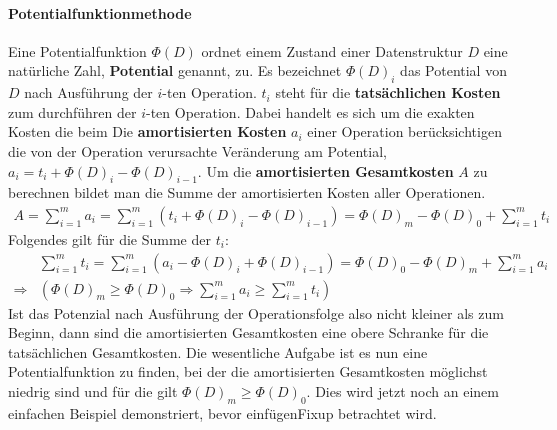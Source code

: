 \documentclass[a4paper,12pt]{article}
\begin{document}
\paragraph{Potentialfunktionmethode} Eine Potentialfunktion $\Phi(D)$ ordnet einem Zustand einer Datenstruktur $D$ eine natürliche Zahl, \textbf{Potential} genannt, zu. Es bezeichnet $\Phi(D)_{i}$ das Potential von $D$ nach Ausführung der $i$-ten Operation. $t_i$ steht für die \textbf{tatsächlichen Kosten} zum durchführen der $i$-ten Operation. Dabei handelt es sich um die exakten Kosten die beim Die \textbf{amortisierten Kosten} $a_i$ einer Operation berücksichtigen die von der Operation verursachte Veränderung am Potential, $a_i = t_i + \Phi(D)_{i} - \Phi(D)_{i-1}$. Um die \textbf{amortisierten Gesamtkosten} $A$ zu berechnen bildet man die Summe der amortisierten Kosten aller Operationen. 
\begin{align*}
A = \sum_{i = 1}^{m} a_i =  \sum_{i = 1}^{m} \left(t_i + \Phi\left(D\right)_{i} - \Phi\left(D\right)_{i-1}\right) = \Phi\left(D\right)_{m} - \Phi\left(D\right)_{0} + \sum_{i = 1}^{m} t_i 
\end{align*}
Folgendes gilt für die Summe der $t_i$:
\begin{align*}
&\sum_{i = 1}^{m} t_i =  \sum_{i = 1}^{m} \left(a_i - \Phi\left(D\right)_{i} + \Phi\left(D\right)_{i-1}\right) = \Phi\left(D\right)_{0} - \Phi\left(D\right)_{m} + \sum_{i = 1}^{m} a_i \\
\Rightarrow &\left( \Phi\left(D\right)_{m} \geq \Phi\left(D\right)_{0} \Rightarrow \sum_{i = 1}^{m} a_i \geq \sum_{i = 1}^{m} t_i \right)
\end{align*}
Ist das Potenzial nach Ausführung der Operationsfolge also nicht kleiner als zum Beginn, dann sind die amortisierten Gesamtkosten eine obere Schranke für die tatsächlichen Gesamtkosten. Die wesentliche Aufgabe ist es nun eine Potentialfunktion zu finden, bei der die amortisierten Gesamtkosten möglichst niedrig sind und für die gilt $\Phi\left(D\right)_{m} \geq \Phi\left(D\right)_{0}$. Dies wird jetzt noch an einem einfachen Beispiel demonstriert, bevor einfügenFixup betrachtet wird. 
\end{document}
